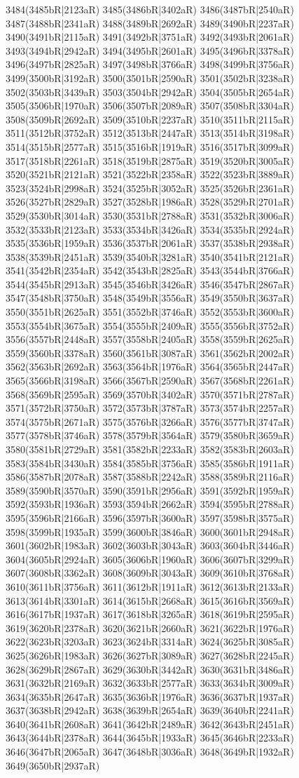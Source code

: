 3484(3485bR|2123aR) 3485(3486bR|3402aR) 3486(3487bR|2540aR) 3487(3488bR|2341aR) 3488(3489bR|2692aR) 3489(3490bR|2237aR) 3490(3491bR|2115aR) 3491(3492bR|3751aR) 3492(3493bR|2061aR) 3493(3494bR|2942aR) 3494(3495bR|2601aR) 3495(3496bR|3378aR) 3496(3497bR|2825aR) 3497(3498bR|3766aR) 3498(3499bR|3756aR) 3499(3500bR|3192aR) 3500(3501bR|2590aR) 3501(3502bR|3238aR) 3502(3503bR|3439aR) 3503(3504bR|2942aR) 3504(3505bR|2654aR) 3505(3506bR|1970aR) 3506(3507bR|2089aR) 3507(3508bR|3304aR) 3508(3509bR|2692aR) 3509(3510bR|2237aR) 3510(3511bR|2115aR) 3511(3512bR|3752aR) 3512(3513bR|2447aR) 3513(3514bR|3198aR) 3514(3515bR|2577aR) 3515(3516bR|1919aR) 3516(3517bR|3099aR) 3517(3518bR|2261aR) 3518(3519bR|2875aR) 3519(3520bR|3005aR) 3520(3521bR|2121aR) 3521(3522bR|2358aR) 3522(3523bR|3889aR) 3523(3524bR|2998aR) 3524(3525bR|3052aR) 3525(3526bR|2361aR) 3526(3527bR|2829aR) 3527(3528bR|1986aR) 3528(3529bR|2701aR) 3529(3530bR|3014aR) 3530(3531bR|2788aR) 3531(3532bR|3006aR) 3532(3533bR|2123aR) 3533(3534bR|3426aR) 3534(3535bR|2924aR) 3535(3536bR|1959aR) 3536(3537bR|2061aR) 3537(3538bR|2938aR) 3538(3539bR|2451aR) 3539(3540bR|3281aR) 3540(3541bR|2121aR) 3541(3542bR|2354aR) 3542(3543bR|2825aR) 3543(3544bR|3766aR) 3544(3545bR|2913aR) 3545(3546bR|3426aR) 3546(3547bR|2867aR) 3547(3548bR|3750aR) 3548(3549bR|3556aR) 3549(3550bR|3637aR) 3550(3551bR|2625aR) 3551(3552bR|3746aR) 3552(3553bR|3600aR) 3553(3554bR|3675aR) 3554(3555bR|2409aR) 3555(3556bR|3752aR) 3556(3557bR|2448aR) 3557(3558bR|2405aR) 3558(3559bR|2625aR) 3559(3560bR|3378aR) 3560(3561bR|3087aR) 3561(3562bR|2002aR) 3562(3563bR|2692aR) 3563(3564bR|1976aR) 3564(3565bR|2447aR) 3565(3566bR|3198aR) 3566(3567bR|2590aR) 3567(3568bR|2261aR) 3568(3569bR|2595aR) 3569(3570bR|3402aR) 3570(3571bR|2787aR) 3571(3572bR|3750aR) 3572(3573bR|3787aR) 3573(3574bR|2257aR) 3574(3575bR|2671aR) 3575(3576bR|3266aR) 3576(3577bR|3747aR) 3577(3578bR|3746aR) 3578(3579bR|3564aR) 3579(3580bR|3659aR) 3580(3581bR|2729aR) 3581(3582bR|2233aR) 3582(3583bR|2603aR) 3583(3584bR|3430aR) 3584(3585bR|3756aR) 3585(3586bR|1911aR) 3586(3587bR|2078aR) 3587(3588bR|2242aR) 3588(3589bR|2116aR) 3589(3590bR|3570aR) 3590(3591bR|2956aR) 3591(3592bR|1959aR) 3592(3593bR|1936aR) 3593(3594bR|2662aR) 3594(3595bR|2788aR) 3595(3596bR|2166aR) 3596(3597bR|3600aR) 3597(3598bR|3575aR) 3598(3599bR|1935aR) 3599(3600bR|3846aR) 3600(3601bR|2948aR) 3601(3602bR|1983aR) 3602(3603bR|3043aR) 3603(3604bR|3446aR) 3604(3605bR|2924aR) 3605(3606bR|1960aR) 3606(3607bR|3299aR) 3607(3608bR|3362aR) 3608(3609bR|3043aR) 3609(3610bR|3768aR) 3610(3611bR|3756aR) 3611(3612bR|1911aR) 3612(3613bR|2133aR) 3613(3614bR|3301aR) 3614(3615bR|2668aR) 3615(3616bR|3569aR) 3616(3617bR|1937aR) 3617(3618bR|3265aR) 3618(3619bR|2595aR) 3619(3620bR|2378aR) 3620(3621bR|2660aR) 3621(3622bR|1976aR) 3622(3623bR|3203aR) 3623(3624bR|3314aR) 3624(3625bR|3085aR) 3625(3626bR|1983aR) 3626(3627bR|3089aR) 3627(3628bR|2245aR) 3628(3629bR|2867aR) 3629(3630bR|3442aR) 3630(3631bR|3486aR) 3631(3632bR|2169aR) 3632(3633bR|2577aR) 3633(3634bR|3009aR) 3634(3635bR|2647aR) 3635(3636bR|1976aR) 3636(3637bR|1937aR) 3637(3638bR|2942aR) 3638(3639bR|2654aR) 3639(3640bR|2241aR) 3640(3641bR|2608aR) 3641(3642bR|2489aR) 3642(3643bR|2451aR) 3643(3644bR|2378aR) 3644(3645bR|1933aR) 3645(3646bR|2233aR) 3646(3647bR|2065aR) 3647(3648bR|3036aR) 3648(3649bR|1932aR) 3649(3650bR|2937aR) 